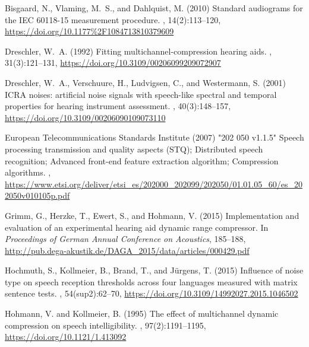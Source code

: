 \documentclass[10pt,a4paper,twocolumn]{article}
\begin{document}
\begin{thebibliography}{}
	Bisgaard, N., Vlaming, M.~S., and Dahlquist, M. (2010)
	\newblock Standard audiograms for the IEC 60118-15 measurement procedure.
	, 14(2):113--120, \url{https://doi.org/10.1177%2F1084713810379609}

	Dreschler, W.~A. (1992)
	\newblock Fitting multichannel-compression hearing aids.
	, 31(3):121--131, \url{https://doi.org/10.3109/00206099209072907}

	Dreschler, W.~A., Verschuure, H., Ludvigsen, C., and Westermann, S. (2001)
	\newblock ICRA noises: artificial noise signals with speech-like spectral and temporal properties for hearing instrument assessment.
	, 40(3):148--157, \url{https://doi.org/10.3109/00206090109073110}

	European Telecommunications Standards Institute (2007)
	\newblock "202 050 v1.1.5" Speech processing transmission and quality aspects (STQ); Distributed speech recognition; Advanced front-end feature extraction algorithm; Compression algorithms.
	, \url{https://www.etsi.org/deliver/etsi_es/202000_202099/202050/01.01.05_60/es_202050v010105p.pdf}

	Grimm, G., Herzke, T., Ewert, S., and Hohmann, V. (2015)
	\newblock Implementation and evaluation of an experimental hearing aid dynamic range compressor.
	\newblock In {\em Proceedings of German Annual Conference on Acoustics}, 185--188, \url{http://pub.dega-akustik.de/DAGA_2015/data/articles/000429.pdf}

	Hochmuth, S., Kollmeier, B., Brand, T., and Jürgens, T. (2015)
	\newblock Influence of noise type on speech reception thresholds across four languages measured with matrix sentence tests.
	, 54(sup2):62--70, \url{https://doi.org/10.3109/14992027.2015.1046502}
	
	Hohmann, V. and Kollmeier, B. (1995)
	\newblock The effect of multichannel dynamic compression on speech intelligibility.
	, 97(2):1191--1195, \url{https://doi.org/10.1121/1.413092}
	

\end{thebibliography}
\end{document}

